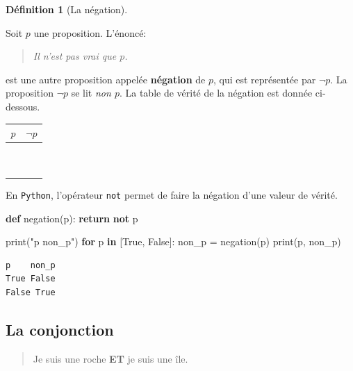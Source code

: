 \documentclass[
  letterpaper,
]{scrbook}
\newenvironment{Shaded}{}{}
\newcommand{\BuiltInTok}[1]{#1}
\newcommand{\ControlFlowTok}[1]{\textcolor[rgb]{0.00,0.44,0.13}{\textbf{#1}}}
\newcommand{\KeywordTok}[1]{\textcolor[rgb]{0.00,0.44,0.13}{\textbf{#1}}}
\newcommand{\NormalTok}[1]{#1}
\newcommand{\OperatorTok}[1]{\textcolor[rgb]{0.40,0.40,0.40}{#1}}
\newcommand{\StringTok}[1]{\textcolor[rgb]{0.25,0.44,0.63}{#1}}
\newcommand{\VariableTok}[1]{\textcolor[rgb]{0.10,0.09,0.49}{#1}}
\theoremstyle{plain}
\theoremstyle{definition}
\theoremstyle{definition}
\newtheorem{definition}{Définition}[chapter]
\theoremstyle{remark}
\begin{document}
\leavevmode{}%
\begin{definition}[La négation]\label{def-negation}

Soit \(p\) une proposition. L'énoncé:

\begin{quote}
\emph{Il n'est pas vrai que \(p\).}
\end{quote}

est une autre proposition appelée \textbf{négation} de \(p\), qui est
représentée par \(\lnot p\). La proposition \(\lnot p\) se lit \emph{non
\(p\)}. La table de vérité de la négation est donnée ci-dessous.

\begin{longtable}[]{@{}cc@{}}
\toprule()
\(p\) & \(\lnot p\) \\
\midrule()
\endhead
\(\phantom{V}\) & \(\phantom{V}\) \\
\(\phantom{V}\) & \(\phantom{V}\) \\
\bottomrule()
\end{longtable}

En \texttt{Python}, l'opérateur \texttt{not} permet de faire la négation
d'une valeur de vérité.

\hypertarget{negation-python}{}
\begin{Shaded}
\begin{Highlighting}[]
\KeywordTok{def}\NormalTok{ negation(p):}
    \ControlFlowTok{return} \KeywordTok{not}\NormalTok{ p}

\BuiltInTok{print}\NormalTok{(}\StringTok{"p    non\_p"}\NormalTok{)}
\ControlFlowTok{for}\NormalTok{ p }\KeywordTok{in}\NormalTok{ [}\VariableTok{True}\NormalTok{, }\VariableTok{False}\NormalTok{]:}
\NormalTok{    non\_p }\OperatorTok{=}\NormalTok{ negation(p)}
    \BuiltInTok{print}\NormalTok{(p, non\_p)}
\end{Highlighting}
\end{Shaded}

\begin{verbatim}
p    non_p
True False
False True
\end{verbatim}

\end{definition}

\hypertarget{la-conjonction}{%
\subsection{La conjonction}\label{la-conjonction}}

\begin{quote}
Je suis une roche \textbf{ET} je suis une île.
\end{quote}
\end{document}
